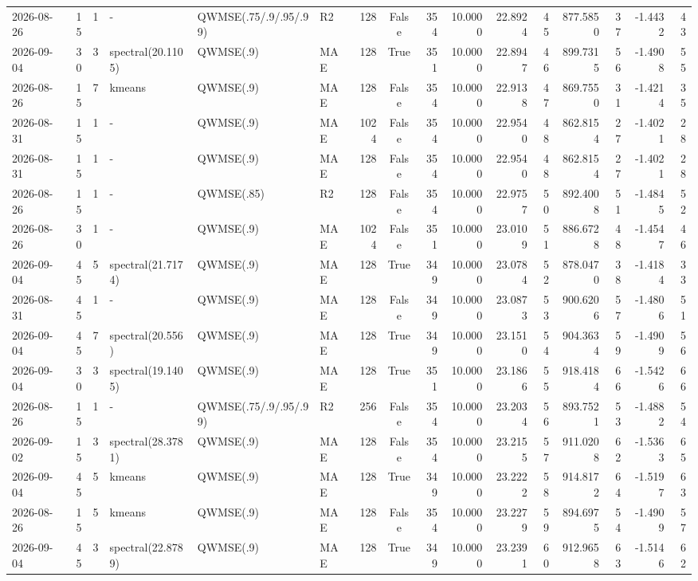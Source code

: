 \documentclass[10pt]{article}
\begin{document}
\begin{landscape}
\begin{longtable}{@{}lrrlllrcrrrrrrrr@{}}
2026-08-26 & 15 & 1 & - & QWMSE(.75/.9/.95/.99) & R2 & 128 & False & 354 & 10.0000 & 22.8924 & 45 & 877.5850 & 37 & -1.4432 & 43 \\
2026-09-04 & 30 & 3 & spectral(20.1105) & QWMSE(.9) & MAE & 128 & True & 351 & 10.0000 & 22.8947 & 46 & 899.7315 & 56 & -1.4908 & 55 \\
2026-08-26 & 15 & 7 & kmeans & QWMSE(.9) & MAE & 128 & False & 354 & 10.0000 & 22.9138 & 47 & 869.7550 & 31 & -1.4214 & 35 \\
2026-08-31 & 15 & 1 & - & QWMSE(.9) & MAE & 1024 & False & 354 & 10.0000 & 22.9540 & 48 & 862.8154 & 27 & -1.4021 & 28 \\
2026-08-31 & 15 & 1 & - & QWMSE(.9) & MAE & 128 & False & 354 & 10.0000 & 22.9540 & 48 & 862.8154 & 27 & -1.4021 & 28 \\
2026-08-26 & 15 & 1 & - & QWMSE(.85) & R2 & 128 & False & 354 & 10.0000 & 22.9757 & 50 & 892.4008 & 51 & -1.4845 & 52 \\
2026-08-26 & 30 & 1 & - & QWMSE(.9) & MAE & 1024 & False & 351 & 10.0000 & 23.0109 & 51 & 886.6728 & 48 & -1.4547 & 46 \\
2026-09-04 & 45 & 5 & spectral(21.7174) & QWMSE(.9) & MAE & 128 & True & 349 & 10.0000 & 23.0784 & 52 & 878.0470 & 38 & -1.4184 & 33 \\
2026-08-31 & 45 & 1 & - & QWMSE(.9) & MAE & 128 & False & 349 & 10.0000 & 23.0873 & 53 & 900.6206 & 57 & -1.4806 & 51 \\
2026-09-04 & 45 & 7 & spectral(20.556) & QWMSE(.9) & MAE & 128 & True & 349 & 10.0000 & 23.1510 & 54 & 904.3634 & 59 & -1.4909 & 56 \\
2026-09-04 & 30 & 3 & spectral(19.1405) & QWMSE(.9) & MAE & 128 & True & 351 & 10.0000 & 23.1866 & 55 & 918.4184 & 66 & -1.5426 & 66 \\
2026-08-26 & 15 & 1 & - & QWMSE(.75/.9/.95/.99) & R2 & 256 & False & 354 & 10.0000 & 23.2034 & 56 & 893.7521 & 53 & -1.4882 & 54 \\
2026-09-02 & 15 & 3 & spectral(28.3781) & QWMSE(.9) & MAE & 128 & False & 354 & 10.0000 & 23.2155 & 57 & 911.0208 & 62 & -1.5363 & 65 \\
2026-09-04 & 45 & 5 & kmeans & QWMSE(.9) & MAE & 128 & True & 349 & 10.0000 & 23.2222 & 58 & 914.8172 & 64 & -1.5197 & 63 \\
2026-08-26 & 15 & 5 & kmeans & QWMSE(.9) & MAE & 128 & False & 354 & 10.0000 & 23.2279 & 59 & 894.6975 & 54 & -1.4909 & 57 \\
2026-09-04 & 45 & 3 & spectral(22.8789) & QWMSE(.9) & MAE & 128 & True & 349 & 10.0000 & 23.2391 & 60 & 912.9658 & 63 & -1.5146 & 62 \\

\end{longtable}
\end{landscape}
\end{document}
